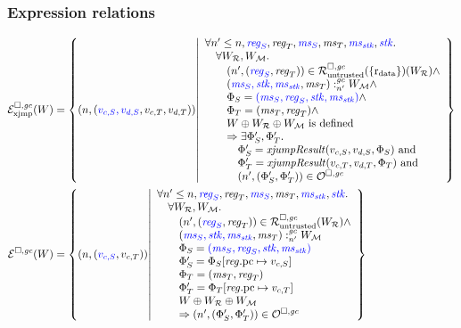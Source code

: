\subsubsection{Expression relations}
\begin{align*}
  \lrexj(W) &= \left\{ \npair{\stpair[.]{v_{c,S},v_{d,S}}{v_{c,T},v_{d,T}}} \middle| 
    \begin{array}{l}
      \forall n' \leq n, \src{\reg_S}, \reg_T, \src{\ms_S}, \ms_T, \src{\ms_\stk}, \src{\stk} \ldotp\\
      \quad \forall W_\lrrs , W_\lrm \ldotp \\
      \qquad\npair[n']{\stpair{\reg}{\reg}} \in \lrr(\{\rdata\}) (W_\lrrs ) \wedge\\
      \qquad\memSat[n']{\stpair[.]{\ms_S,\stk,\ms_\stk}{\ms_T}}{W_\lrm} \wedge \\
      \qquad\Phi_S = \src{(\ms_S,\reg_S,\stk, \ms_\stk)}\wedge\\
      \qquad\Phi_T = (\ms_T,\reg_T) \wedge\\
      \qquad W \oplus W_\lrrs \oplus W_\lrm \text{ is defined }\\
      \qquad\Rightarrow \exists \Phi_S',\Phi_T'\ldotp\\
      \quad\qquad \Phi_S' = \xjumpResult{v_{c,S}}{v_{d,S}}{\Phi_S} \tand\\
      \quad\qquad\Phi_T' = \xjumpResult{v_{c,T}}{v_{d,T}}{\Phi_T}\tand\\
      \quad\qquad\npair[n']{\left(\Phi_S', \Phi_T' \right)}\in \lro
    \end{array}
    \right\}\\
  \lre(W) &= \left\{ \npair{\stpair[.]{v_{c,S}}{v_{c,T}}} \middle| 
    \begin{array}{l}
      \forall n' \leq n, \src{\reg_S}, \reg_T, \src{\ms_S}, \ms_T, \src{\ms_\stk}, \src{\stk} \ldotp\\
      \quad \forall W_\lrrs , W_\lrm \ldotp \\
      \qquad\npair[n']{\stpair{\reg}{\reg}} \in \lrr(W_\lrrs ) \wedge\\
      \qquad\memSat[n']{\stpair[.]{\ms_S,\stk,\ms_\stk}{\ms_T}}{W_\lrm} \\
      \qquad\Phi_S = \src{(\ms_S,\reg_S,\stk, \ms_\stk)}\\
      \qquad \Phi_S' = \Phi_S \updReg{\pcreg}{v_{c,S}}\\
      \qquad\Phi_T = (\ms_T,\reg_T)\\
      \qquad\Phi_T' = \Phi_T\updReg{\pcreg}{v_{c,T}}\\
      \qquad W \oplus W_\lrrs \oplus W_\lrm\\
      \qquad\Rightarrow\npair[n']{\left(\Phi_S', \Phi_T' \right)}\in \lro
    \end{array}
    \right\}
\end{align*}

